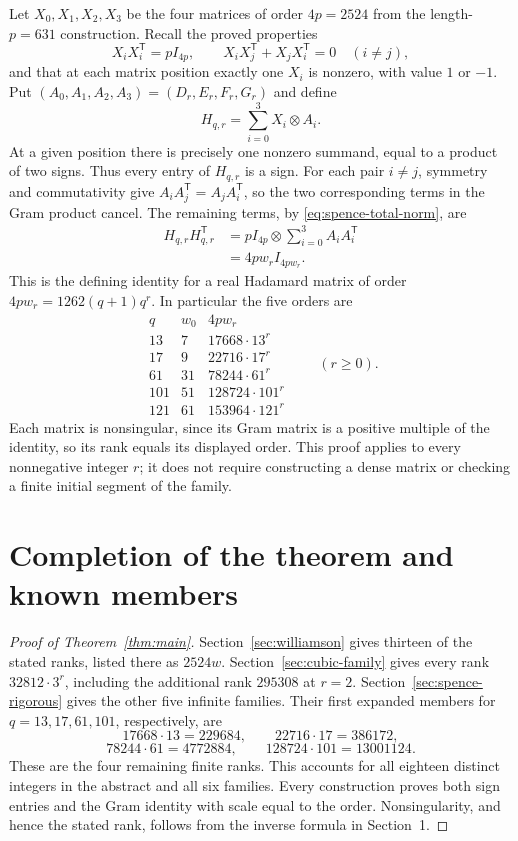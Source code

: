 \documentclass[10pt]{article}
\begin{document}
Let $X_0,X_1,X_2,X_3$ be the four matrices of order $4p=2524$ from the
length-$p=631$ construction. Recall the proved properties
\[
 X_iX_i^{\mathsf T}=pI_{4p},\qquad
 X_iX_j^{\mathsf T}+X_jX_i^{\mathsf T}=0\quad(i\ne j),
\]
and that at each matrix position exactly one $X_i$ is nonzero, with value
$1$ or $-1$. Put $(A_0,A_1,A_2,A_3)=(D_r,E_r,F_r,G_r)$ and define
\[
 H_{q,r}=\sum_{i=0}^3X_i\otimes A_i.
\]
At a given position there is precisely one nonzero summand, equal to a
product of two signs. Thus every entry of $H_{q,r}$ is a sign. For each
pair $i\ne j$, symmetry and commutativity give
$A_iA_j^{\mathsf T}=A_jA_i^{\mathsf T}$, so the two corresponding terms
in the Gram product cancel. The remaining terms, by
\eqref{eq:spence-total-norm}, are
\[
 \begin{split}
 H_{q,r}H_{q,r}^{\mathsf T}
 &=pI_{4p}\otimes\sum_{i=0}^3A_iA_i^{\mathsf T}\\
 &=4pw_rI_{4pw_r}.
 \end{split}
\]
This is the defining identity for a real Hadamard matrix of order
$4pw_r=1262(q+1)q^r$. In particular the five orders are
\[
\begin{array}{c|r|l}
 q&w_0&4pw_r\\\hline
 13&7&17668\cdot13^r\\
 17&9&22716\cdot17^r\\
 61&31&78244\cdot61^r\\
 101&51&128724\cdot101^r\\
 121&61&153964\cdot121^r
\end{array}
\qquad(r\geq0).
\]
Each matrix is nonsingular, since its Gram matrix is a positive multiple
of the identity, so its rank equals its displayed order. This proof applies
to every nonnegative integer $r$; it does not require constructing a dense
matrix or checking a finite initial segment of the family.


\section{Completion of the theorem and known members}\label{sec:conclusion}

\begin{proof}[Proof of Theorem~\ref{thm:main}]
Section~\ref{sec:williamson} gives thirteen of the stated ranks, listed
there as $2524w$. Section~\ref{sec:cubic-family} gives every rank
$32812\cdot3^r$, including the additional rank $295308$ at $r=2$.
Section~\ref{sec:spence-rigorous} gives the other five infinite families.
Their first expanded members for $q=13,17,61,101$, respectively, are
\[
 17668\cdot13=229684,\qquad 22716\cdot17=386172,
\]
\[
 78244\cdot61=4772884,\qquad128724\cdot101=13001124.
\]
These are the four remaining finite ranks. This accounts for all
eighteen distinct integers in the abstract and all six families.
Every construction proves both sign entries and the Gram identity
with scale equal to the order. Nonsingularity, and hence the stated
rank, follows from the inverse formula in Section~1.
\end{proof}
\end{document}
